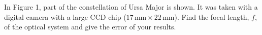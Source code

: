 In Figure 1, part of the constellation of Ursa Major is shown. It was taken
with a digital camera with a large CCD chip
($17\,\mathrm{mm} \times 22\,\mathrm{mm}$). Find the focal length, $f$, of
the optical system and give the error of your results.
